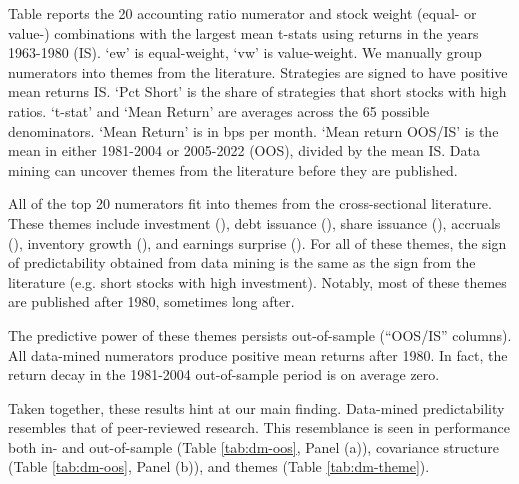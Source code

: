 \begin{table}
\caption{Themes from Mining Accounting Ratios in 1980}\label{tab:dm-theme}
\small

Table reports the 20 accounting ratio numerator and stock weight (equal- or value-) combinations with the largest mean t-stats using returns in the years 1963-1980 (IS). `ew' is equal-weight, `vw' is value-weight. We manually group numerators into themes from the literature. Strategies are signed to have positive mean returns IS. `Pct Short' is the share of strategies that short stocks with high  ratios.  `t-stat' and  `Mean Return' are averages across the 65 possible denominators. `Mean Return' is in bps per month. `Mean return OOS/IS' is the mean in either 1981-2004 or 2005-2022 (OOS),  divided by the mean IS. Data mining can uncover themes from the literature before they are published.
\vspace{2ex}

\centering

\setlength{\tabcolsep}{2.0ex}

\end{table}

All of the top 20 numerators fit into themes from the cross-sectional literature.  These themes include investment (\citet{titman2004capital}), debt issuance (\citet{spiess1999long}), share issuance (\citet{loughran1995new}), accruals (\citet{sloan1996stock}),  inventory growth (\citet{thomas2002inventory}), and earnings surprise (\citet{watts1978systematic}). For all of these themes, the sign of predictability obtained from  data mining is the same as the sign from the literature (e.g. short stocks with high investment).  Notably, most of these themes are published after 1980, sometimes long after.

The predictive power of these themes persists out-of-sample (``OOS/IS'' columns). All data-mined numerators produce positive mean returns after 1980. In fact, the return decay in the 1981-2004 out-of-sample period is on average zero. 

Taken together, these results hint at our main finding. Data-mined predictability resembles that of peer-reviewed research. This resemblance is seen in performance both in- and out-of-sample (Table \ref{tab:dm-oos}, Panel (a)), covariance structure (Table \ref{tab:dm-oos}, Panel (b)), and themes (Table \ref{tab:dm-theme}). 


